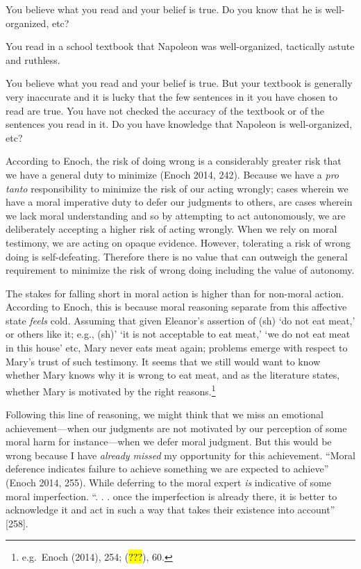 \documentclass[
  letterpaper,
  DIV=11,
  numbers=noendperiod]{scrartcl}
\theoremstyle{remark}
\begin{document}
You believe what you read and your belief is true. Do you know that he
is well-organized, etc?

You read in a school textbook that Napoleon was well-organized,
tactically astute and ruthless.

You believe what you read and your belief is true. But your textbook is
generally very inaccurate and it is lucky that the few sentences in it
you have chosen to read are true. You have not checked the accuracy of
the textbook or of the sentences you read in it. Do you have knowledge
that Napoleon is well-organized, etc?

According to Enoch, the risk of doing wrong is a considerably greater
risk that we have a general duty to minimize (Enoch 2014, 242). Because
we have a \emph{pro tanto} responsibility to minimize the risk of our
acting wrongly; cases wherein we have a moral imperative duty to defer
our judgments to others, are cases wherein we lack moral understanding
and so by attempting to act autonomously, we are deliberately accepting
a higher risk of acting wrongly. When we rely on moral testimony, we are
acting on opaque evidence. However, tolerating a risk of wrong doing is
self-defeating. Therefore there is no value that can outweigh the
general requirement to minimize the risk of wrong doing including the
value of autonomy.

The stakes for falling short in moral action is higher than for
non-moral action. According to Enoch, this is because moral reasoning
separate from this affective state \emph{feels} cold. Assuming that
given Eleanor's assertion of (sh) `do not eat meat,' or others like it;
e.g., (sh)' `it is not acceptable to eat meat,' `we do not eat meat in
this house' etc, Mary never eats meat again; problems emerge with
respect to Mary's trust of such testimony. It seems that we still would
want to know whether Mary knows why it is wrong to eat meat, and as the
literature states, whether Mary is motivated by the right
reasons.\footnote{e.g.~Enoch (2014), 254; (\hl{???}), 60.}

Following this line of reasoning, we might think that we miss an
emotional achievement---when our judgments are not motivated by our
perception of some moral harm for instance---when we defer moral
judgment. But this would be wrong because I have \emph{already missed}
my opportunity for this achievement. ``Moral deference indicates failure
to achieve something we are expected to achieve'' (Enoch 2014, 255).
While deferring to the moral expert \emph{is} indicative of some moral
imperfection. ``. . . once the imperfection is already there, it is
better to acknowledge it and act in such a way that takes their
existence into account'' {[}258{]}.
\end{document}
